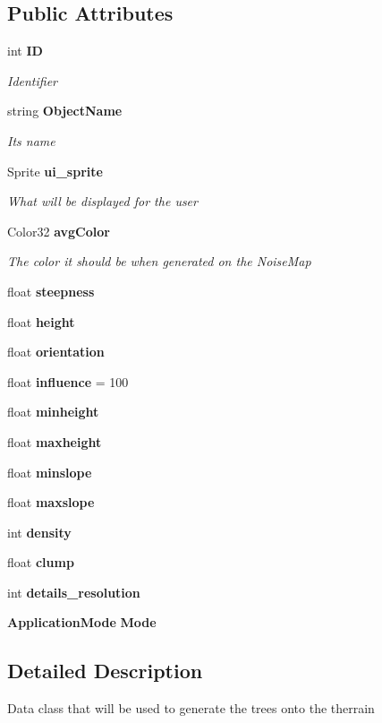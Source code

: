 \subsection*{Public Attributes}
\begin{DoxyCompactItemize}
\item 
int \textbf{ ID}
\begin{DoxyCompactList}\small\item\em Identifier \end{DoxyCompactList}\item 
string \textbf{ Object\+Name}
\begin{DoxyCompactList}\small\item\em Its name \end{DoxyCompactList}\item 
Sprite \textbf{ ui\+\_\+sprite}
\begin{DoxyCompactList}\small\item\em What will be displayed for the user \end{DoxyCompactList}\item 
Color32 \textbf{ avg\+Color}
\begin{DoxyCompactList}\small\item\em The color it should be when generated on the Noise\+Map \end{DoxyCompactList}\item 
float \textbf{ steepness}
\item 
float \textbf{ height}
\item 
float \textbf{ orientation}
\item 
float \textbf{ influence} = 100
\item 
float \textbf{ minheight}
\item 
float \textbf{ maxheight}
\item 
float \textbf{ minslope}
\item 
float \textbf{ maxslope}
\item 
int \textbf{ density}
\item 
float \textbf{ clump}
\item 
int \textbf{ details\+\_\+resolution}
\item 
\textbf{ Application\+Mode} \textbf{ Mode}
\end{DoxyCompactItemize}


\subsection{Detailed Description}
Data class that will be used to generate the trees onto the therrain 



